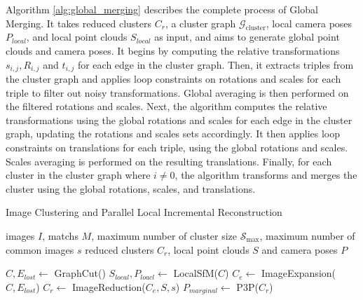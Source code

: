 \documentclass[runningheads]{llncs}
\begin{document}
Algorithm \ref{alg:global_merging} describes the complete process of Global Merging. It takes reduced clusters $C_r$, a cluster graph $\mathcal{G}_{\text{cluster}}$, local camera poses $P_{local}$, and local point clouds  $S_{local}$ as input, and aims to generate global point clouds and camera poses. It begins by computing the relative transformations $s_{i,j},R_{i,j}$ and $t_{i,j}$ for each edge in the cluster graph. Then, it extracts triples from the cluster graph and applies loop constraints on rotations and scales for each triple to filter out noisy transformations. Global averaging is then performed on the filtered rotations and scales. Next, the algorithm computes the relative transformations using the global rotations and scales for each edge in the cluster graph, updating the rotations and scales sets accordingly. It then applies loop constraints on translations for each triple, using the global rotations and scales. Scales averaging is performed on the resulting translations. Finally, for each cluster in the cluster graph where  $i \neq 0$, the algorithm transforms and merges the cluster using the global rotations, scales, and translations.






\begin{algorithm}
\caption{Image Clustering and Parallel Local Incremental Reconstruction}
\label{alg:image_clustering_ISFM}
\begin{algorithmic}[1]
\Require images $I$, matchs $M$, maximum number of cluster size $\mathcal{S}_{\text{max}}$, maximum number of common images $s$
\Ensure reduced clusters $C_r$, local point clouds $S$ and camera poses $P$

\State $C,E_{lost} \gets$ GraphCut()  
\State $S_{local},P_{loacl} \gets$ LocalSfM($C$) 
\State $C_e \gets$ ImageExpansion($C, E_{lost}$)   
\State $C_r \gets$ ImageReduction($C_e, S, s$)     
\State $P_{ marginal} \gets$ P3P($C_r$) 

\end{algorithmic}
\end{algorithm}
\end{document}
